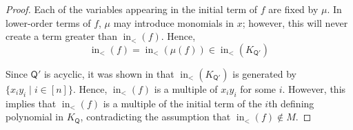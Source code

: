 \documentclass[10pt]{amsart}
\numberwithin{equation}{section}
\theoremstyle{definition}
\theoremstyle{remark}
\DeclareMathOperator{\In}{\mathrm{in}}
\newcommand{\1}{^{-1}}
\def\Q{\mathsf{Q}}
\begin{document}
\begin{proof}

Each of the variables appearing in the initial term of $f$ are fixed by $\mu$.  In lower-order terms of $f$, $\mu$ may introduce monomials in $x$; however, this will never create a term greater than $\In_<(f)$.  Hence, %
\[ \In_<(f) = \In_<(\mu(f)) \in \In_<(K_{\Q'})\]

Since $\Q'$ is acyclic, it was shown in \cite[Corollary 1.17]{BFZ05} that $\In_<(K_{\Q'})$ is generated by $\{x_iy_i \mid i\in [n]\}$.  Hence, $\In_<(f)$ is a multiple of $x_iy_i$ for some $i$.  However, this implies that $\In_<(f)$ is a multiple of the initial term of the $i$th defining polynomial in $K_\Q$, contradicting the assumption that $\In_<(f)\not\in M$.


\end{proof}
\end{document}
